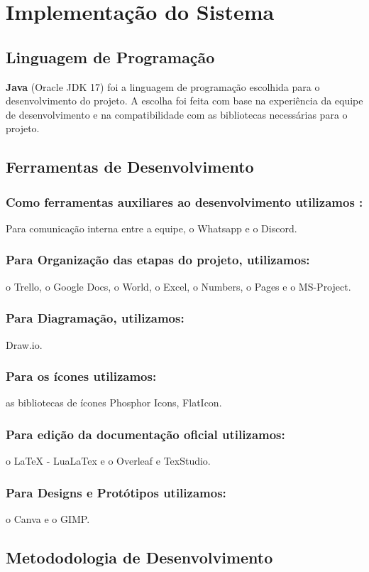 \documentclass[../main.tex]{subfiles}
\begin{document}
\section{Implementação do Sistema}
\subsection{Linguagem de Programação}
\textbf{Java} (Oracle JDK 17) foi a linguagem de programação escolhida para o desenvolvimento do projeto.
A escolha foi feita com base na experiência da equipe de desenvolvimento e na compatibilidade 
com as bibliotecas necessárias para o projeto.
\subsection{Ferramentas de Desenvolvimento}
    \subsubsection{Como ferramentas auxiliares ao desenvolvimento utilizamos :}
    Para comunicação interna entre a equipe, o Whatsapp e o Discord.
    \subsubsection{Para Organização das etapas do projeto, utilizamos:}
    o Trello, o Google Docs, o World, o Excel, o Numbers, o Pages e o MS-Project.
    \subsubsection{Para Diagramação, utilizamos: }
    Draw.io.
    \subsubsection{Para os ícones utilizamos:}
     as bibliotecas de ícones Phosphor Icons, FlatIcon.
    \subsubsection{Para edição da documentação oficial utilizamos:}
     o LaTeX - LuaLaTex e o Overleaf e TexStudio.
    \subsubsection{Para Designs e Protótipos utilizamos:}
    o Canva e o GIMP.

    
\subsection{Metododologia de Desenvolvimento}
\end{document}
